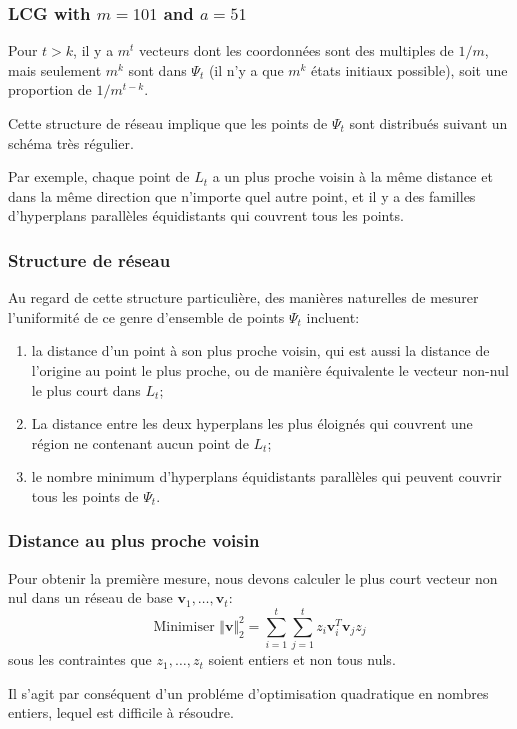 \documentclass[t,usepdftitle=false]{beamer}
\def\bv{\boldsymbol{v}}
\begin{document}
\begin{frame}
\frametitle{LCG with $m=101$ and $a=51$}

Pour $t > k$, il y a $m^t$ vecteurs dont les coordonnées sont des multiples de $1/m$, mais seulement $m^k$ sont dans $\Psi_t$
(il n'y a que $m^k$ états initiaux possible), soit une proportion de
$1/m^{t-k}$.

\mbox{}

Cette structure de réseau implique que les points de $\Psi_t$ sont
distribués suivant un schéma très régulier.

\mbox{}

Par exemple, chaque point de $L_t$ a un plus proche voisin à la même
distance et dans la même direction que n'importe quel autre point, et
il y a des familles d'hyperplans parallèles
équidistants qui couvrent tous les points.

\end{frame}

\begin{frame}
\frametitle{Structure de réseau}

Au regard de cette structure particulière, des manières naturelles de
mesurer l'uniformité de ce genre d'ensemble de points $\Psi_t$
incluent:
\begin{enumerate}
\item
la distance d'un point à son plus proche voisin, qui est aussi la
distance de l'origine au point le plus proche, ou de manière
équivalente le vecteur non-nul le plus court dans $L_t$;
\item
La distance entre les deux hyperplans les plus éloignés qui couvrent
une région ne contenant aucun point de $L_t$;
\item
le nombre minimum d'hyperplans équidistants parallèles qui peuvent
couvrir tous les points de $\Psi_t$.
\end{enumerate}

\end{frame}

\begin{frame}
\frametitle{Distance au plus proche voisin}

Pour obtenir la première mesure, nous devons calculer le plus court
vecteur non nul dans un réseau de base $\bv_1,\dots,\bv_t$:
\[
 \mbox{Minimiser } \Vert\bv\Vert_2^2 = 
  \sum_{i=1}^t \sum_{j=1}^t z_i \bv_i^T \bv_j z_j 
\]
sous les contraintes que $z_1,\dots,z_t$ soient entiers et non tous nuls.

\mbox{}

Il s'agit par conséquent d'un probléme d'optimisation quadratique en
nombres entiers, lequel est difficile à résoudre.

\end{frame}
\end{document}
